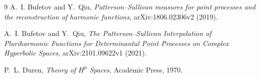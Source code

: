 \documentclass[11pt]{article}
\begin{document}
\begin{thebibliography}{9}
A.~I. Bufetov and Y.~Qiu,
\emph{Patterson--Sullivan measures for point processes and the
reconstruction of harmonic functions}, arXiv:1806.02306v2 (2019).

A.~I. Bufetov and Y.~Qiu,
\emph{The Patterson--Sullivan Interpolation of Pluriharmonic Functions for
Determinantal Point Processes on Complex Hyperbolic Spaces},
arXiv:2101.09622v1 (2021).

P.~L. Duren, \emph{Theory of $H^p$ Spaces}, Academic Press, 1970.
\end{thebibliography}
\end{document}
